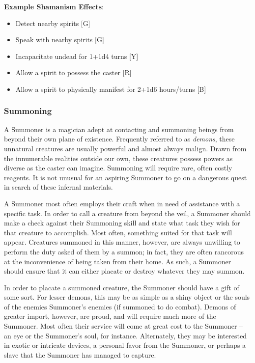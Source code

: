 \documentclass[oneside]{book}
\begin{document}
\begin{multicols}{2}
\textbf{Example Shamanism Effects}: 
	\begin{itemize}
		\setlength{\itemsep}{0cm}%
  		\setlength{\parskip}{0cm}%
		\item{ \small Detect nearby spirits [G]}
		\item{ \small Speak with nearby spirits [G]}
		\item{ \small Incapacitate undead for 1+1d4 turns [Y]}
		\item{ \small Allow a spirit to possess the caster [R]}
		\item{ \small Allow a spirit to physically manifest for 2+1d6 hours/turns [B]}
	\end{itemize}

\subsubsection{Summoning}
A Summoner is a magician adept at contacting and summoning beings from beyond their own plane of existence. Frequently referred to as \emph{demons}, these unnatural creatures are usually powerful and almost always malign. Drawn from the innumerable realities outside our own, these creatures possess powers as diverse as the caster can imagine. Summoning will require rare, often costly reagents. It is not unusual for an aspiring Summoner to go on a dangerous quest in search of these infernal materials.

A Summoner most often employs their craft when in need of assistance with a specific task. In order to call a creature from beyond the veil, a Summoner should make a check against their Summoning skill and state what task they wish for that creature to accomplish. Most often, something suited for that task will appear. Creatures summoned in this manner, however, are always unwilling to perform the duty asked of them by a summon; in fact, they are often rancorous at the inconvenience of being taken from their home. As such, a Summoner should ensure that it can either placate or destroy whatever they may summon. 

In order to placate a summoned creature, the Summoner should have a gift of some sort. For lesser demons, this may be as simple as a shiny object or the souls of the enemies Summoner's enemies (if summoned to do combat). Demons of greater import, however, are proud, and will require much more of the Summoner. Most often their service will come at great cost to the Summoner -- an eye or the Summoner's soul, for instance. Alternately, they may be interested in exotic or intricate devices, a personal favor from the Summoner, or perhaps a slave that the Summoner has managed to capture. 


\end{multicols}
\end{document}
